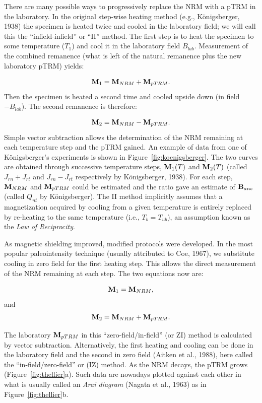 There are many possible  ways  to progressively replace the NRM with a pTRM in the laboratory.  In the original step-wise heating method (e.g., K\"onigsberger, 1938)  the specimen is heated twice and cooled in the laboratory field; we will call this  the ``infield-infield'' or ``II'' method.    The first step is  to heat the specimen to some temperature ($T_1$) and cool it  in the laboratory field $B_{lab}$.  Measurement of  the combined remanence (what is left of the natural remanence plus the new laboratory pTRM) yields:

$$
 \hbox{\bf M}_{1} = \hbox{\bf M}_{NRM} + \hbox{\bf M}_{ pTRM}. 
$$
\noindent  Then the specimen  is heated a second time and cooled upside down (in field $-B_{lab}$).  The second remanence is therefore:

$$
 \hbox{\bf M}_{2} = \hbox{\bf M}_{NRM} -\hbox{\bf M}_{ pTRM}. 
$$
\noindent Simple vector subtraction allows the determination of the NRM remaining at each temperature step and the pTRM gained.  An example of data from one of K\"onigsberger's experiments is shown in Figure~\ref{fig:koenigsberger}. The two curves are obtained through successive temperature steps,  $\hbox{\bf M}_1(T)$ and $\hbox{\bf M}_2(T)$  (called $J_{rn}+J_{rt}$ and $J_{rn}-J_{rt}$ respectively by 
\nocite{koenigsberger38}
K\"onigsberger, 1938).  For each step, $\hbox{\bf M}_{NRM}$ and $\hbox{\bf M}_{pTRM}$ could be estimated and the ratio gave an estimate of $\hbox{\bf B}_{anc}$ (called $Q_{nt}$ by K\"onigsberger).   The II method implicitly assumes that a magnetization acquired by cooling from a given temperature is entirely replaced by re-heating to the same temperature (i.e., $T_b=T_{ub}$), an assumption known as the 
{\it Law of Reciprocity}.  

As magnetic shielding improved,  modified protocols were developed.  
In the most popular paleointensity  technique (usually attributed to 
Coe,  1967), \nocite{coe67} we substitute cooling in zero field for the first heating step.  This  allows  the direct measurement of the NRM remaining at each step.   The two equations now are:

$$
 \hbox{\bf M}_1 = \hbox{\bf M}_{NRM},   
$$
\noindent and
$$
 \hbox{\bf M}_2 = \hbox{\bf M}_{NRM} + \hbox{\bf M}_{ pTRM}. 
$$

\noindent  The laboratory  $\hbox{\bf M}_{ pTRM}$ in this ``zero-field/in-field'' (or ZI) method is calculated by  vector subtraction.  Alternatively, the first heating and cooling can be done in the laboratory field and the second in zero field
 (Aitken et al., 1988),  \nocite{aitken88} here called the ``in-field/zero-field'' or (IZ) method.  As the NRM decays, the pTRM grows (Figure~\ref{fig:thellier}a).  Such data are  nowadays plotted against each other in what is usually called an 
{\it Arai diagram} 
 (Nagata et al.,  1963) \nocite{nagata63} as in Figure~\ref{fig:thellier}b. 


